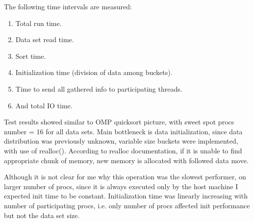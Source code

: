 \documentclass{article}
\begin{document}
The following time intervals are measured:
\begin{enumerate}[1.]
\item Total run time.
\item Data set read time.
\item Sort time.
\item Initialization time (division of data among buckets).
\item Time to send all gathered info to participating threads.
\item And total IO time.
\end{enumerate}
Test results showed similar to OMP quicksort picture, with sweet spot procs number = 16 for
all data sets. Main bottleneck is data initialization, since data distribution was previously
unknown, variable size buckets were implemented, with use of realloc(). According to realloc
documentation, if it is unable to find appropriate chunk of memory, new memory is allocated
with followed data move. 

\pagebreak


\noindent Although it is not clear for me why this operation was the slowest performer, on larger
number of procs, since it is always executed only by the host machine I expected init time to
be constant. Initialization time was linearly increasing with number of participating
procs, i.e. only number of procs affected init performance but not the data set size.
\end{document}

